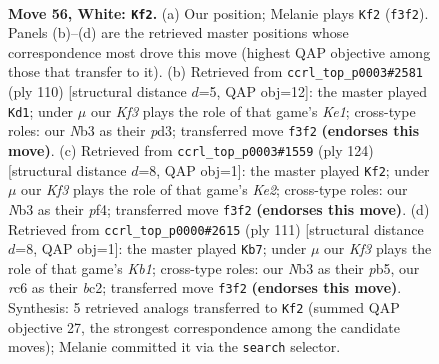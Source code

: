 \documentclass[11pt]{article}
\begin{document}
\clearpage

\begin{figure}[p]\centering
\begin{subfigure}{0.46\textwidth}\centering
\resizebox{\linewidth}{!}{%
\newchessgame
\chessboard[
  setfen={7k/2P5/2r5/8/8/1N3K2/7B/8 w - - 25 56},
  showmover=false,
  pgfstyle=straightmove, color=movearrow, markmove={f3-f2}
]}
\caption{}
\end{subfigure}\hfill
\begin{subfigure}{0.46\textwidth}\centering
\resizebox{\linewidth}{!}{%
\newchessgame
\chessboard[
  setfen={3B4/8/8/5k2/7P/3p4/7r/4K3 w - - 3 56},
  showmover=false,
  pgfstyle=straightmove, color=movearrow, markmove={e1-d1}
]}
\caption{}
\end{subfigure}
\\[4pt]
\begin{subfigure}{0.46\textwidth}\centering
\resizebox{\linewidth}{!}{%
\newchessgame
\chessboard[
  setfen={8/7B/5k2/8/4Pp2/2r5/4K3/8 w - - 10 63},
  showmover=false,
  pgfstyle=straightmove, color=movearrow, markmove={e2-f2}
]}
\caption{}
\end{subfigure}\hfill
\begin{subfigure}{0.46\textwidth}\centering
\resizebox{\linewidth}{!}{%
\newchessgame
\chessboard[
  setfen={1k6/8/3K1b2/1P6/8/2p5/2B5/8 b - - 1 56},
  showmover=false,
  pgfstyle=straightmove, color=movearrow, markmove={b8-b7}
]}
\caption{}
\end{subfigure}
\caption{\textbf{Move 56, White: \texttt{Kf2}.} (a) Our position; Melanie plays \texttt{Kf2} (\texttt{f3f2}). Panels (b)--(d) are the retrieved master positions whose correspondence most drove this move (highest QAP objective among those that transfer to it). (b) Retrieved from \texttt{ccrl\_top\_p0003\#2581} (ply 110) [structural distance $d$=5, QAP obj=12]: the master played \texttt{Kd1}; under $\mu$ our \emph{Kf3} plays the role of that game's \emph{Ke1}; cross-type roles: our \emph{N}b3 as their \emph{p}d3; transferred move \texttt{f3f2} \textbf{(endorses this move)}. (c) Retrieved from \texttt{ccrl\_top\_p0003\#1559} (ply 124) [structural distance $d$=8, QAP obj=1]: the master played \texttt{Kf2}; under $\mu$ our \emph{Kf3} plays the role of that game's \emph{Ke2}; cross-type roles: our \emph{N}b3 as their \emph{p}f4; transferred move \texttt{f3f2} \textbf{(endorses this move)}. (d) Retrieved from \texttt{ccrl\_top\_p0000\#2615} (ply 111) [structural distance $d$=8, QAP obj=1]: the master played \texttt{Kb7}; under $\mu$ our \emph{Kf3} plays the role of that game's \emph{Kb1}; cross-type roles: our \emph{N}b3 as their \emph{p}b5, our \emph{r}c6 as their \emph{b}c2; transferred move \texttt{f3f2} \textbf{(endorses this move)}. Synthesis: 5 retrieved analogs transferred to \texttt{Kf2} (summed QAP objective 27, the strongest correspondence among the candidate moves); Melanie committed it via the \texttt{search} selector.}
\label{fig:thought-m110}
\end{figure}
\end{document}
